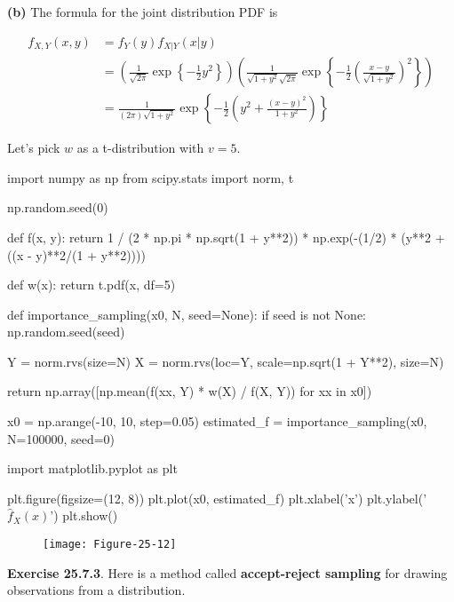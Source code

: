 \textbf{(b)} The formula for the joint distribution PDF is

\[ 
\begin{align}
f_{X, Y}(x, y) &= f_Y(y) f_{X | Y}(x | y) \\
&= \left( \frac{1}{\sqrt{2 \pi}} \exp \left\{ -\frac{1}{2} y^2 \right\} \right)
\left( \frac{1}{\sqrt{1 + y^2} \sqrt{2 \pi}} \exp \left\{ -\frac{1}{2} \left( \frac{x - y}{\sqrt{1 + y^2}} \right)^2\right\} \right) \\
&= \frac{1}{(2 \pi) \sqrt{1 + y^2}} \exp \left\{ -\frac{1}{2} \left( y^2 + \frac{(x - y)^2}{1 + y^2} \right) \right\}
\end{align}
\]

Let's pick \(w\) as a t-distribution with \(v = 5\).

\begin{python}
import numpy as np
from scipy.stats import norm, t

np.random.seed(0)

def f(x, y):
    return 1 / (2 * np.pi * np.sqrt(1 + y**2)) * np.exp(-(1/2) * (y**2 + ((x - y)**2/(1 + y**2))))

def w(x):
    return t.pdf(x, df=5)

def importance_sampling(x0, N, seed=None):
    if seed is not None:
        np.random.seed(seed)
        
    Y = norm.rvs(size=N)
    X = norm.rvs(loc=Y, scale=np.sqrt(1 + Y**2), size=N)
    
    return np.array([np.mean(f(xx, Y) * w(X) / f(X, Y)) for xx in x0])
\end{python}

\begin{python}
x0 = np.arange(-10, 10, step=0.05)
estimated_f = importance_sampling(x0, N=100000, seed=0)
\end{python}

\begin{python}
import matplotlib.pyplot as plt

plt.figure(figsize=(12, 8))
plt.plot(x0, estimated_f)
plt.xlabel('x')
plt.ylabel('$\hat{f}_X(x)$')
plt.show()
\end{python}

\begin{figure}[H]
\texttt{[image: Figure-25-12]}
\end{figure}

\textbf{Exercise 25.7.3}. Here is a method called \textbf{accept-reject
sampling} for drawing observations from a distribution.

